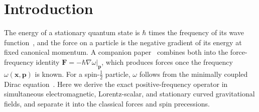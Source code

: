 \documentclass[aps,prd,onecolumn,tightenlines,nofootinbib,notitlepage,10pt,floatfix]{revtex4-2}
\theoremstyle{indentedtheorem}
\begin{document}
\maketitle

\section{Introduction}
\label{sec:intro}

The energy of a stationary quantum state is $\hbar$ times the frequency of its wave function~\citep{Planck1901Radiation,Einstein1905Photoelectric}, and the force on a particle is the negative gradient of its energy at fixed canonical momentum. A companion paper~\citep{HutchisonSGM2026} combines both into the force-frequency identity $\mathbf{F}=-\hbar\nabla\omega|_{\mathbf{p}}$, which produces forces once the frequency $\omega(\mathbf{x},\mathbf{p})$ is known. For a spin-$\tfrac{1}{2}$ particle, $\omega$ follows from the minimally coupled Dirac equation~\citep{Dirac1928Quantum}. Here we derive the exact positive-frequency operator in simultaneous electromagnetic, Lorentz-scalar, and stationary curved gravitational fields, and separate it into the classical forces and spin precessions.
\end{document}
